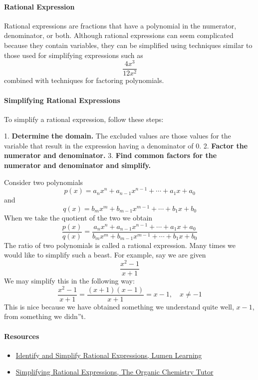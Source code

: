 \paragraph{Rational Expression}

Rational expressions are fractions that have a polynomial in the numerator, denominator, or both. Although rational expressions can seem complicated because they contain variables, they can be simplified using techniques similar to those used for simplifying expressions such as 
$$
\frac{4x^3}{12x^2}
$$
combined with techniques for factoring polynomials.

\paragraph{Simplifying Rational Expressions}

To simplify a rational expression, follow these steps:

1. \textbf{Determine the domain.} The excluded values are those values for the variable that result in the expression having a denominator of $0$.
2. \textbf{Factor the numerator and denominator.}
3. \textbf{Find common factors for the numerator and denominator and simplify.}

Consider two polynomials
$$
p(x) = a_n x^n + a_{n-1} x^{n-1} + \cdots + a_1 x + a_0
$$
and
$$
q(x) = b_m x^m + b_{m-1} x^{m-1} + \cdots + b_1 x + b_0
$$
When we take the quotient of the two we obtain
$$
\frac{p(x)}{q(x)} = \frac{a_n x^n + a_{n-1} x^{n-1} + \cdots + a_1 x + a_0}{b_m x^m + b_{m-1} x^{m-1} + \cdots + b_1 x + b_0}
$$
The ratio of two polynomials is called a rational expression. Many times we would like to simplify such a beast. For example, say we are given
$$
\frac{x^2 - 1}{x + 1}
$$
We may simplify this in the following way:
$$
\frac{x^2 - 1}{x + 1} = \frac{(x + 1)(x - 1)}{x + 1} = x - 1, \quad x \neq -1
$$
This is nice because we have obtained something we understand quite well, $x - 1$, from something we didn''t.

\paragraph{Resources}

\begin{itemize}
    \item \href{https://courses.lumenlearning.com/beginalgebra/chapter/6-1-1-introduction-to-rational-expressions/}{Identify and Simplify Rational Expressions, Lumen Learning}
    \item \href{https://www.youtube.com/watch?v=uVpsz-xpnPo}{Simplifying Rational Expressions, The Organic Chemistry Tutor}
\end{itemize}

